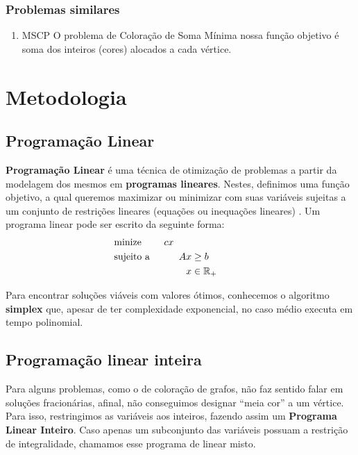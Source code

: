 \documentclass[11pt]{article}
\begin{document}
\subsubsection{Problemas similares}
\label{sec:org29e70e1}
\begin{enumerate}
\item MSCP
\label{sec:org14b1d41}
O problema de Coloração de Soma Mínima nossa função objetivo é soma dos inteiros (cores) alocados a cada vértice.
\end{enumerate}
\section{Metodologia}
\label{sec:org7f9b27a}
\subsection{Programação Linear}
\label{sec:orgb1eee4c}
\textbf{Programação Linear} é uma técnica de otimização de problemas a partir da modelagem dos mesmos em \textbf{programas lineares}.
Nestes, definimos uma função objetivo, a qual queremos maximizar ou minimizar com suas variáveis sujeitas a um conjunto de restrições lineares (equações ou inequações lineares) \textcite{Chvatal1983LinearProgramming} . Um programa linear pode ser escrito da seguinte forma:
\begin{alignat*}{4}
& \omit\rlap{minize \quad \quad $\displaystyle cx$} \\
& \mbox{sujeito a}&& \quad & Ax & \geq b  & \quad &  \\
&                 &&       & x               & \in \mathbb{R}_+ &      &
\end{alignat*}

Para encontrar soluções viáveis com valores ótimos, conhecemos o algoritmo \textbf{simplex} que, apesar de ter complexidade exponencial, no caso médio executa em tempo polinomial.

\subsection{Programação linear inteira}
\label{sec:org9d5fb36}
Para alguns problemas, como o de coloração de grafos, não faz sentido falar em soluções fracionárias, afinal, não conseguimos designar ``meia cor'' a um vértice.
Para isso, restringimos as variáveis aos inteiros, fazendo assim um \textbf{Programa Linear Inteiro}. Caso apenas um subconjunto das variáveis possuam a restrição de integralidade, chamamos esse programa de linear misto.
\end{document}
